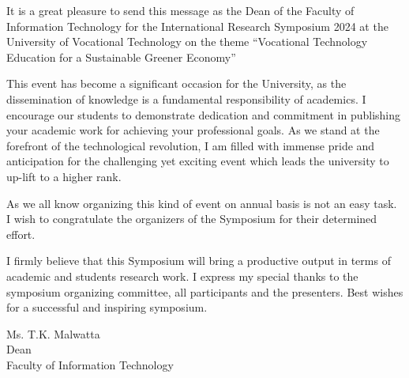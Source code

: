 \thispagestyle{fancy}
	




   
    



	

	It is a great pleasure to send this message as the Dean of the Faculty of Information Technology for the International Research Symposium 2024 at the University of Vocational Technology on the theme “Vocational Technology Education for a Sustainable Greener Economy”
    
This event has become a significant occasion for the University, as the dissemination of knowledge is a fundamental responsibility of academics. I encourage our students to demonstrate dedication and commitment in publishing your academic work for achieving your professional goals. As we stand at the forefront of the technological revolution, I am filled with immense pride and anticipation for the challenging yet exciting event which leads the university to up-lift to a higher rank.

As we all know organizing this kind of event on annual basis is not an easy task. I wish to congratulate the organizers of the Symposium for their determined effort.

I firmly believe that this Symposium will bring a productive output in terms of academic and students research work. I express my special thanks to the symposium organizing committee, all participants and the presenters.
Best wishes for a successful and inspiring symposium.

\vspace{1cm}
	\noindent
    
Ms. T.K. Malwatta \\
Dean \\
Faculty of Information Technology
	\newpage
	